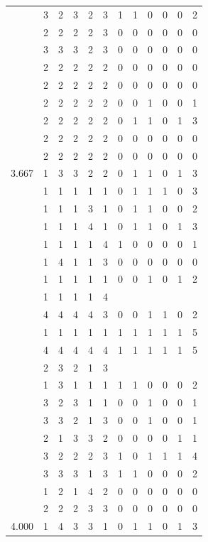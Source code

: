 \documentclass[]{msu-thesis}
\theoremstyle{definition}
\theoremstyle{definition}
\theoremstyle{definition}
\theoremstyle{remark}
\begin{document}
\begin{table}
{\begin{tabular}[t]{rrrrrrrrrrrr}
 & 3 & 2 & 3 & 2 & 3 & 1 & 1 & 0 & 0 & 0 & 2\\
 & 2 & 2 & 2 & 2 & 3 & 0 & 0 & 0 & 0 & 0 & 0\\
 & 3 & 3 & 3 & 2 & 3 & 0 & 0 & 0 & 0 & 0 & 0\\
 & 2 & 2 & 2 & 2 & 2 & 0 & 0 & 0 & 0 & 0 & 0\\
 & 2 & 2 & 2 & 2 & 2 & 0 & 0 & 0 & 0 & 0 & 0\\
 & 2 & 2 & 2 & 2 & 2 & 0 & 0 & 1 & 0 & 0 & 1\\
 & 2 & 2 & 2 & 2 & 2 & 0 & 1 & 1 & 0 & 1 & 3\\
 & 2 & 2 & 2 & 2 & 2 & 0 & 0 & 0 & 0 & 0 & 0\\
 & 2 & 2 & 2 & 2 & 2 & 0 & 0 & 0 & 0 & 0 & 0\\
3.667 & 1 & 3 & 3 & 2 & 2 & 0 & 1 & 1 & 0 & 1 & 3\\
 & 1 & 1 & 1 & 1 & 1 & 0 & 1 & 1 & 1 & 0 & 3\\
 & 1 & 1 & 1 & 3 & 1 & 0 & 1 & 1 & 0 & 0 & 2\\
 & 1 & 1 & 1 & 4 & 1 & 0 & 1 & 1 & 0 & 1 & 3\\
 & 1 & 1 & 1 & 1 & 4 & 1 & 0 & 0 & 0 & 0 & 1\\
 & 1 & 4 & 1 & 1 & 3 & 0 & 0 & 0 & 0 & 0 & 0\\
 & 1 & 1 & 1 & 1 & 1 & 0 & 0 & 1 & 0 & 1 & 2\\
 & 1 & 1 & 1 & 1 & 4 &  &  &  &  &  & \\
 & 4 & 4 & 4 & 4 & 3 & 0 & 0 & 1 & 1 & 0 & 2\\
 & 1 & 1 & 1 & 1 & 1 & 1 & 1 & 1 & 1 & 1 & 5\\
 & 4 & 4 & 4 & 4 & 4 & 1 & 1 & 1 & 1 & 1 & 5\\
 & 2 & 3 & 2 & 1 & 3 &  &  &  &  &  & \\
 & 1 & 3 & 1 & 1 & 1 & 1 & 1 & 0 & 0 & 0 & 2\\
 & 3 & 2 & 3 & 1 & 1 & 0 & 0 & 1 & 0 & 0 & 1\\
 & 3 & 3 & 2 & 1 & 3 & 0 & 0 & 1 & 0 & 0 & 1\\
 & 2 & 1 & 3 & 3 & 2 & 0 & 0 & 0 & 0 & 1 & 1\\
 & 3 & 2 & 2 & 2 & 3 & 1 & 0 & 1 & 1 & 1 & 4\\
 & 3 & 3 & 3 & 1 & 3 & 1 & 1 & 0 & 0 & 0 & 2\\
 & 1 & 2 & 1 & 4 & 2 & 0 & 0 & 0 & 0 & 0 & 0\\
 & 2 & 2 & 2 & 3 & 3 & 0 & 0 & 0 & 0 & 0 & 0\\
4.000 & 1 & 4 & 3 & 3 & 1 & 0 & 1 & 1 & 0 & 1 & 3\\

\end{tabular}}
\end{table}
\end{document}
